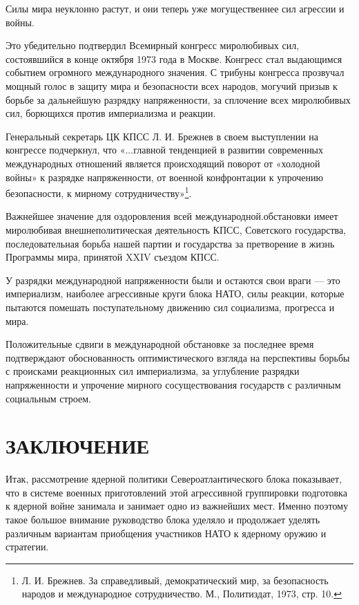 \documentclass[12pt, a4paper, openany]{book}
\begin{document}
	Силы мира неуклонно растут, и они теперь уже могущественнее сил агрессии и войны.
	
	Это убедительно подтвердил Всемирный конгресс миролюбивых сил, состоявшийся в конце октября 1973 года в Москве. Конгресс стал выдающимся событием огромного международного значения. С трибуны конгресса прозвучал мощный голос в защиту мира и безопасности всех народов, могучий призыв к борьбе за дальнейшую разрядку напряженности, за сплочение всех миролюбивых сил, борющихся против империализма и реакции.
	
	Генеральный секретарь ЦК КПСС Л. И. Брежнев в своем выступлении на конгрессе подчеркнул, что «...главной тенденцией в развитии современных международных отношений является происходящий поворот от «холодной войны» к разрядке напряженности, от военной конфронтации к упрочению безопасности, к мирному сотрудничеству»{\footnote{Л. И. Брежнев. За справедливый, демократический мир, за безопасность народов и международное сотрудничество. М., Политиздат, 1973, стр. 10.}}.
	
	Важнейшее значение для оздоровления всей международной.обстановки имеет миролюбивая внешнеполитическая деятельность КПСС, Советского государства, последовательная борьба нашей партии и государства за претворение в жизнь Программы мира, принятой XXIV съездом КПСС.
	
	У разрядки международной напряженности были и остаются свои враги — это империализм, наиболее агрессивные круги блока НАТО, силы реакции, которые пытаются помешать поступательному движению сил социализма, прогресса и мира.
	
	Положительные сдвиги в международной обстановке за последнее время подтверждают обоснованность оптимистического взгляда на перспективы борьбы с происками реакционных сил империализма, за углубление разрядки напряженности и упрочение мирного сосуществования государств с различным социальным строем.
	
		\newpage
	\section[Заключение]{\center \textbf{ЗАКЛЮЧЕНИЕ}}	
	
	
	Итак, рассмотрение ядерной политики Североатлантического блока показывает, что в системе военных приготовлений этой агрессивной группировки подготовка к ядерной войне занимала и занимает одно из важнейших мест. Именно поэтому такое большое внимание руководство блока уделяло и продолжает уделять различным вариантам приобщения участников НАТО к ядерному оружию и стратегии.
	
\end{document}
